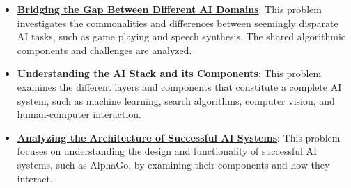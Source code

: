 \documentclass{article}%
\begin{document}
\begin{itemize}[leftmargin=*]
\item \href{https://purdue.brightspace.com/d2l/common/assets/pdfjs-d2l-dist/1.0.14-legacy/web/viewer.html?file=\%2Fcontent\%2Fenforced\%2F1095467-wl.202510.CS.24300.001\%2F02L2-Intro.pdf\%3Fou\%3D1095467\&lang=en-us\&container=d2l-fileviewer-rendered-pdf\&fullscreen=d2l-fileviewer-rendered-pdf-dialog\&height=667#page=31}{\textbf{Bridging the Gap Between Different AI Domains}}: This problem investigates the commonalities and differences between seemingly disparate AI tasks, such as game playing and speech synthesis. The shared algorithmic components and challenges are analyzed.%
\item \href{https://purdue.brightspace.com/d2l/common/assets/pdfjs-d2l-dist/1.0.14-legacy/web/viewer.html?file=\%2Fcontent\%2Fenforced\%2F1095467-wl.202510.CS.24300.001\%2F02L2-Intro.pdf\%3Fou\%3D1095467\&lang=en-us\&container=d2l-fileviewer-rendered-pdf\&fullscreen=d2l-fileviewer-rendered-pdf-dialog\&height=667#page=44}{\textbf{Understanding the AI Stack and its Components}}: This problem examines the different layers and components that constitute a complete AI system, such as machine learning, search algorithms, computer vision, and human-computer interaction.%
\item \href{https://purdue.brightspace.com/d2l/common/assets/pdfjs-d2l-dist/1.0.14-legacy/web/viewer.html?file=\%2Fcontent\%2Fenforced\%2F1095467-wl.202510.CS.24300.001\%2F02L2-Intro.pdf\%3Fou\%3D1095467\&lang=en-us\&container=d2l-fileviewer-rendered-pdf\&fullscreen=d2l-fileviewer-rendered-pdf-dialog\&height=667#page=50}{\textbf{Analyzing the Architecture of Successful AI Systems}}: This problem focuses on understanding the design and functionality of successful AI systems, such as AlphaGo, by examining their components and how they interact.%
\end{itemize}%
\end{document}
